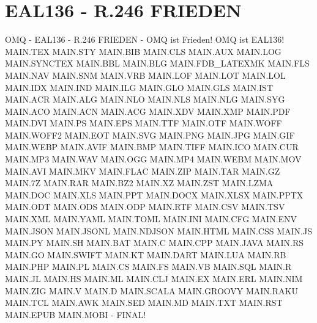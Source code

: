 \documentclass{MAIN}
\begin{document}
\section*{EAL136 - R.246 FRIEDEN}
OMQ - EAL136 - R.246 FRIEDEN - OMQ ist Frieden! OMQ ist EAL136!
MAIN.TEX MAIN.STY MAIN.BIB MAIN.CLS MAIN.AUX MAIN.LOG MAIN.SYNCTEX MAIN.BBL MAIN.BLG MAIN.FDB_LATEXMK MAIN.FLS MAIN.NAV MAIN.SNM MAIN.VRB MAIN.LOF MAIN.LOT MAIN.LOL MAIN.IDX MAIN.IND MAIN.ILG MAIN.GLO MAIN.GLS MAIN.IST MAIN.ACR MAIN.ALG MAIN.NLO MAIN.NLS MAIN.NLG MAIN.SYG MAIN.ACO MAIN.ACN MAIN.ACG MAIN.XDV MAIN.XMP MAIN.PDF MAIN.DVI MAIN.PS MAIN.EPS MAIN.TTF MAIN.OTF MAIN.WOFF MAIN.WOFF2 MAIN.EOT MAIN.SVG MAIN.PNG MAIN.JPG MAIN.GIF MAIN.WEBP MAIN.AVIF MAIN.BMP MAIN.TIFF MAIN.ICO MAIN.CUR MAIN.MP3 MAIN.WAV MAIN.OGG MAIN.MP4 MAIN.WEBM MAIN.MOV MAIN.AVI MAIN.MKV MAIN.FLAC MAIN.ZIP MAIN.TAR MAIN.GZ MAIN.7Z MAIN.RAR MAIN.BZ2 MAIN.XZ MAIN.ZST MAIN.LZMA MAIN.DOC MAIN.XLS MAIN.PPT MAIN.DOCX MAIN.XLSX MAIN.PPTX MAIN.ODT MAIN.ODS MAIN.ODP MAIN.RTF MAIN.CSV MAIN.TSV MAIN.XML MAIN.YAML MAIN.TOML MAIN.INI MAIN.CFG MAIN.ENV MAIN.JSON MAIN.JSONL MAIN.NDJSON MAIN.HTML MAIN.CSS MAIN.JS MAIN.PY MAIN.SH MAIN.BAT MAIN.C MAIN.CPP MAIN.JAVA MAIN.RS MAIN.GO MAIN.SWIFT MAIN.KT MAIN.DART MAIN.LUA MAIN.RB MAIN.PHP MAIN.PL MAIN.CS MAIN.FS MAIN.VB MAIN.SQL MAIN.R MAIN.JL MAIN.HS MAIN.ML MAIN.CLJ MAIN.EX MAIN.ERL MAIN.NIM MAIN.ZIG MAIN.V MAIN.D MAIN.SCALA MAIN.GROOVY MAIN.RAKU MAIN.TCL MAIN.AWK MAIN.SED MAIN.MD MAIN.TXT MAIN.RST MAIN.EPUB MAIN.MOBI - FINAL!
\end{document}
